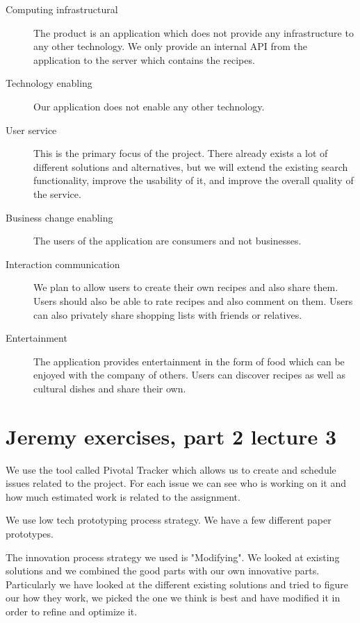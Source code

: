 \begin{description}
\item[Computing infrastructural] The product is an application which does not provide any infrastructure to any other technology. We only provide an internal API from the application to the server which contains the recipes.
\item[Technology enabling] Our application does not enable any other technology.
\item[User service] This is the primary focus of the project. There already exists a lot of different solutions and alternatives, but we will extend the existing search functionality, improve the usability of it, and improve the overall quality of the service.
\item[Business change enabling] The users of the application are consumers and not businesses.
\item[Interaction communication] We plan to allow users to create their own recipes and also share them. Users should also be able to rate recipes and also comment on them. Users can also privately share shopping lists with friends or relatives.
\item[Entertainment] The application provides entertainment in the form of food which can be enjoyed with the company of others. Users can discover recipes as well as cultural dishes and share their own.
\end{description}

\section*{Jeremy exercises, part 2 lecture 3}

We use the tool called Pivotal Tracker which allows us to create and schedule issues related to the project. For each issue we can see who is working on it and how much estimated work is related to the assignment.

We use low tech prototyping process strategy. We have a few different paper prototypes.

The innovation process strategy we used is "Modifying". We looked at existing solutions and we combined the good parts with our own innovative parts. Particularly we have looked at the different existing solutions and tried to figure our how they work, we picked the one we think is best and have modified it in order to refine and optimize it.

